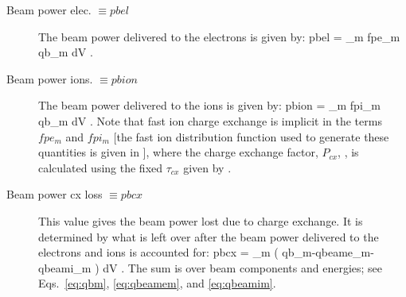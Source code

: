 \begin{description}
 \item[Beam power elec. $\equiv pbel $] The beam power delivered to the
 electrons is given by:
 \beq
  pbel = \sum_m  fpe_m \int  qb_m  dV .
 \eeq
 \item[Beam power ions. $\equiv pbion $] The beam power delivered to the ions 
 is given by:
 \beq
  pbion = \sum_m  fpi_m \int  qb_m  dV .
 \eeq
 Note that fast ion charge exchange is implicit in the terms $fpe_m$ and $fpi_m$
 [the fast ion distribution function used to generate these quantities is given
 in ], where the charge exchange factor, $P_{cx}$, , is
 calculated  using the fixed $\tau_{cx} $ given by . 

 \item[Beam power cx loss $\equiv pbcx$] This value gives the beam power lost
 due to charge exchange. It is determined by what is left over after the  beam
 power delivered to the electrons and ions is accounted for:
 \beq
  pbcx = \sum_m  \int \left ( qb_m-qbeame_m-qbeami_m \right) dV .
 \eeq
 The sum is over beam components and energies; see Eqs.~\eqref{eq:qbm},
 \eqref{eq:qbeamem}, and \eqref{eq:qbeamim}.
\end{description}


